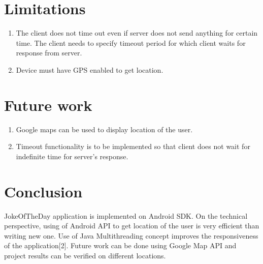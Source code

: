\documentclass[11pt]{report}
\begin{document}
\section{Limitations}
\begin{enumerate}
\item The client does not time out even if server does not send anything for certain time. The client needs to specify timeout period for which client waits for response from server.
\item Device must have GPS enabled to get location.
\end{enumerate}

\section{Future work}
\begin{enumerate}
\item Google maps can be used to display location of the user.
\item Timeout functionality is to be implemented so that client does not wait for indefinite time for server’s response.
\end{enumerate}

\section{Conclusion}
JokeOfTheDay application is implemented on Android SDK. On the technical perspective, using of Android API to get location of the user is very efficient than writing new one. Use of Java Multithreading concept improves the responsiveness of the application[2]. Future work can be done using Google Map API and project results can be verified on different locations.
\end{document}
